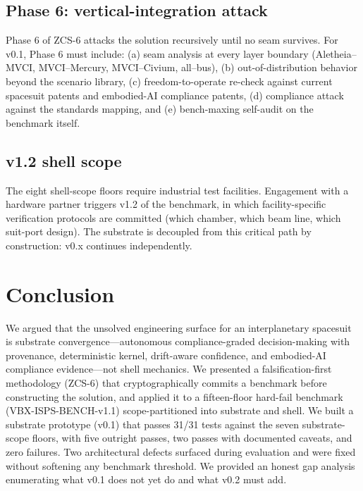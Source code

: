 \documentclass[conference]{IEEEtran}
\theoremstyle{definition}
\theoremstyle{plain}
\theoremstyle{remark}
\begin{document}
\subsection{Phase 6: vertical-integration attack}

Phase 6 of ZCS-6 attacks the solution recursively until no seam survives. For v0.1, Phase 6 must include: (a) seam analysis at every layer boundary (Aletheia--MVCI, MVCI--Mercury, MVCI--Civium, all--bus), (b) out-of-distribution behavior beyond the scenario library, (c) freedom-to-operate re-check against current spacesuit patents and embodied-AI compliance patents, (d) compliance attack against the standards mapping, and (e) bench-maxing self-audit on the benchmark itself.

\subsection{v1.2 shell scope}

The eight shell-scope floors require industrial test facilities. Engagement with a hardware partner triggers v1.2 of the benchmark, in which facility-specific verification protocols are committed (which chamber, which beam line, which suit-port design). The substrate is decoupled from this critical path by construction: v0.x continues independently.

\section{Conclusion}
\label{sec:conclusion}

We argued that the unsolved engineering surface for an interplanetary spacesuit is substrate convergence---autonomous compliance-graded decision-making with provenance, deterministic kernel, drift-aware confidence, and embodied-AI compliance evidence---not shell mechanics. We presented a falsification-first methodology (ZCS-6) that cryptographically commits a benchmark before constructing the solution, and applied it to a fifteen-floor hard-fail benchmark (VBX-ISPS-BENCH-v1.1) scope-partitioned into substrate and shell. We built a substrate prototype (v0.1) that passes 31/31 tests against the seven substrate-scope floors, with five outright passes, two passes with documented caveats, and zero failures. Two architectural defects surfaced during evaluation and were fixed without softening any benchmark threshold. We provided an honest gap analysis enumerating what v0.1 does not yet do and what v0.2 must add.
\end{document}

